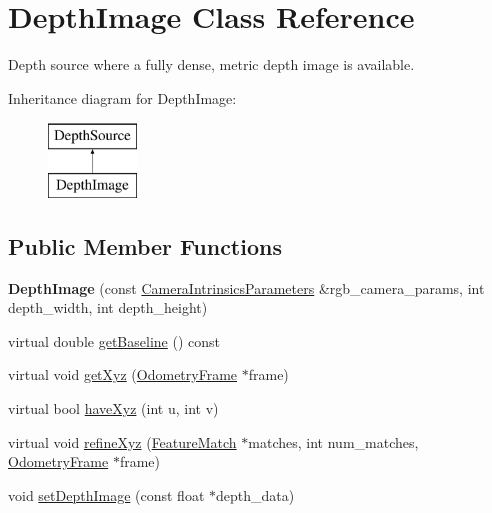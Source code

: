 \hypertarget{classfovis_1_1DepthImage}{
\section{DepthImage Class Reference}
\label{classfovis_1_1DepthImage}
}


Depth source where a fully dense, metric depth image is available.  


Inheritance diagram for DepthImage:\begin{figure}[H]
\begin{center}
\leavevmode
\includegraphics[height=2.000000cm]{classfovis_1_1DepthImage}
\end{center}
\end{figure}
\subsection*{Public Member Functions}
\begin{DoxyCompactItemize}
\item 
\hypertarget{classfovis_1_1DepthImage_ad14961dd8148a0bde0f129e38f05ce05}{
{\bfseries DepthImage} (const \hyperlink{structfovis_1_1CameraIntrinsicsParameters}{CameraIntrinsicsParameters} \&rgb\_\-camera\_\-params, int depth\_\-width, int depth\_\-height)}
\label{classfovis_1_1DepthImage_ad14961dd8148a0bde0f129e38f05ce05}

\item 
virtual double \hyperlink{classfovis_1_1DepthImage_a5429ab9acd4e4f8d154c952ff95b1149}{getBaseline} () const 
\item 
virtual void \hyperlink{classfovis_1_1DepthImage_a0b83e0c45768e90787bc7f0c2c77606d}{getXyz} (\hyperlink{classfovis_1_1OdometryFrame}{OdometryFrame} $\ast$frame)
\item 
virtual bool \hyperlink{classfovis_1_1DepthImage_ab94d0972d755837688cfc95aa144a6e1}{haveXyz} (int u, int v)
\item 
virtual void \hyperlink{classfovis_1_1DepthImage_ad0922053f71946f74bc26225848010e6}{refineXyz} (\hyperlink{classfovis_1_1FeatureMatch}{FeatureMatch} $\ast$matches, int num\_\-matches, \hyperlink{classfovis_1_1OdometryFrame}{OdometryFrame} $\ast$frame)
\item 
void \hyperlink{classfovis_1_1DepthImage_a02865b6272767324308c9b912d65a466}{setDepthImage} (const float $\ast$depth\_\-data)
\end{DoxyCompactItemize}


